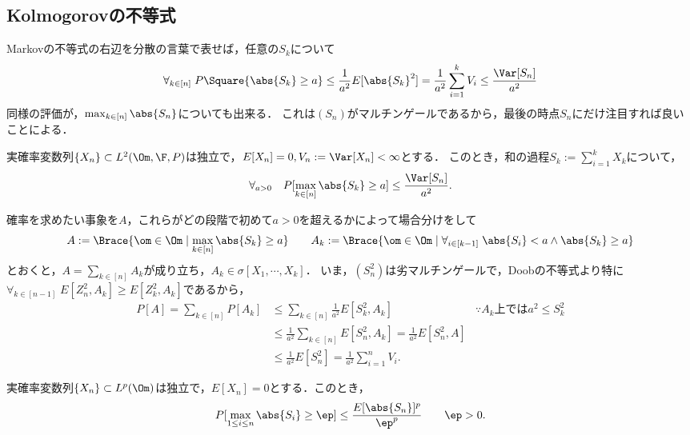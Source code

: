 \documentclass[uplatex,dvipdfmx]{jsreport}
\begin{document}
\subsection{Kolmogorovの不等式}

\begin{tcolorbox}[colframe=ForestGreen, colback=ForestGreen!10!white,breakable,colbacktitle=ForestGreen!40!white,coltitle=black,fonttitle=\bfseries\sffamily,
    title=独立確率変数の和の過程の最大値]
    Markovの不等式の右辺を分散の言葉で表せば，任意の$S_k$について
    \[\forall_{k\in[n]}\;P\Square{\abs{S_k}\ge a}\le\frac{1}{a^2}E[\abs{S_k}^2]=\frac{1}{a^2}\sum_{i=1}^kV_i\le\frac{\Var[S_n]}{a^2}\]
    同様の評価が，$\max_{k\in[n]}\abs{S_n}$についても出来る．
    これは$(S_n)$がマルチンゲールであるから，最後の時点$S_n$にだけ注目すれば良いことによる．
\end{tcolorbox}

\begin{theorem}[Kolmogorov]\label{thm-Kolmogorov-inequality}
    実確率変数列$\{X_n\}\subset L^2(\Om,\F,P)$は独立で，$E[X_n]=0,V_n:=\Var[X_n]<\infty$とする．
    このとき，和の過程$S_k:=\sum^k_{i=1}X_k$について，
    \[\forall_{a>0}\quad P[\max_{k\in[n]}\abs{S_k}\ge a]\le\frac{\Var[S_n]}{a^2}.\]
\end{theorem}
\begin{Proof}
    確率を求めたい事象を$A$，これらがどの段階で初めて$a>0$を超えるかによって場合分けをして
    \[A:=\Brace{\om\in\Om\mid\max_{k\in[n]}\abs{S_k}\ge a}\qquad A_k:=\Brace{\om\in\Om\mid\forall_{i\in[k-1]}\;\abs{S_i}<a\land\abs{S_k}\ge a}\]
    とおくと，$A=\sum_{k\in[n]}A_k$が成り立ち，$A_k\in\sigma[X_1,\cdots,X_k]$．
    いま，$(S^2_n)$は劣マルチンゲールで，Doobの不等式より特に$\forall_{k\in[n-1]}\;E[Z^2_n,A_k]\ge E[Z_k^2,A_k]$であるから，
    \begin{align*}
        P[A]=\sum_{k\in[n]}P[A_k]&\le\sum_{k\in[n]}\frac{1}{a^2}E[S_k^2,A_k]&\because A_k\text{上では}a^2\le S^2_k\\
        &\le\frac{1}{a^2}\sum_{k\in[n]}E[S_n^2,A_k]
        =\frac{1}{a^2}E[S_n^2,A]\\
        &\le\frac{1}{a^2}E[S_n^2]
        =\frac{1}{a^2}\sum^n_{i=1}V_i.
    \end{align*}
\end{Proof}

\begin{corollary}\label{cor-Kolmogorov-inequality}
    実確率変数列$\{X_n\}\subset L^p(\Om)$は独立で，$E[X_n]=0$とする．このとき，
    \[P[\max_{1\le i\le n}\abs{S_i}\ge\ep]\le\frac{E[\abs{S_n}]^p}{\ep^p}\qquad\ep>0.\]
\end{corollary}
\end{document}
